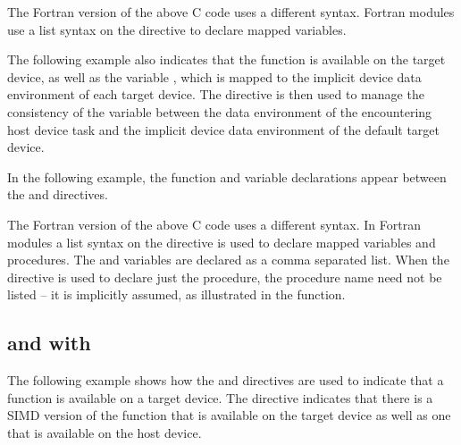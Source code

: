 
The Fortran version of the above C code uses a different syntax. Fortran modules 
use a list syntax on the   directive to declare 
mapped variables.


The following example also indicates that the function  is available on the 
target device, as well as the variable , which is mapped to the implicit device 
data environment of each target device. The   directive 
is then used to manage the consistency of the variable  between the data environment 
of the encountering host device task and the implicit device data environment of 
the default target device.

In the following example, the function and variable declarations appear between 
the   and    
directives.


The Fortran version of the above C code uses a different syntax. In Fortran modules 
a list syntax on the   directive is used to declare 
mapped variables and procedures. The  and  variables are declared as a comma 
separated list. When the   directive is used to 
declare just the procedure, the procedure name need not be listed -- it is implicitly 
assumed, as illustrated in the  function.


\subsection{  and    with  }
\label{subsec:declare_target_simd}

The following example shows how the   and  
  directives are used to indicate that a function 
is available on a target device. The   directive indicates 
that there is a SIMD version of the function  that is available on the target 
device as well as one that is available on the host device.


